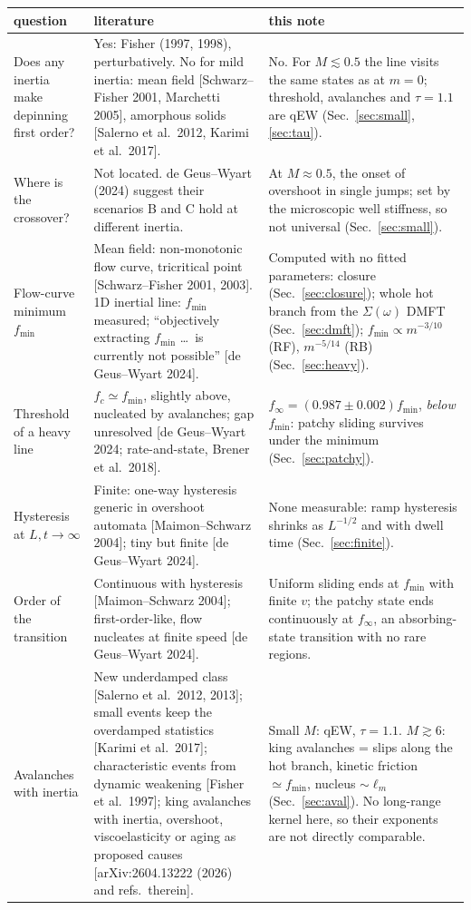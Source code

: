 \documentclass[10pt,a4paper]{article}
\begin{document}
\begin{center}\small
\begin{tabular}{p{2.6cm}p{6.4cm}p{6.6cm}}
\toprule
question & literature & this note \\
\midrule
Does any inertia make depinning first order? & Yes: Fisher (1997, 1998), perturbatively. No for mild inertia: mean field [Schwarz--Fisher 2001, Marchetti 2005], amorphous solids [Salerno et al.\ 2012, Karimi et al.\ 2017]. & No. For $M\lesssim0.5$ the line visits the same states as at $m=0$; threshold, avalanches and $\tau=1.1$ are qEW (Sec.~\ref{sec:small}, \ref{sec:tau}). \\
Where is the crossover? & Not located. de Geus--Wyart (2024) suggest their scenarios B and C hold at different inertia. & At $M\approx0.5$, the onset of overshoot in single jumps; set by the microscopic well stiffness, so not universal (Sec.~\ref{sec:small}). \\
Flow-curve minimum $f_{\min}$ & Mean field: non-monotonic flow curve, tricritical point [Schwarz--Fisher 2001, 2003]. 1D inertial line: $f_{\min}$ measured; ``objectively extracting $f_{\min}$ \ldots\ is currently not possible'' [de Geus--Wyart 2024]. & Computed with no fitted parameters: closure (Sec.~\ref{sec:closure}); whole hot branch from the $\Sigma(\omega)$ DMFT (Sec.~\ref{sec:dmft}); $f_{\min}\propto m^{-3/10}$ (RF), $m^{-5/14}$ (RB) (Sec.~\ref{sec:heavy}). \\
Threshold of a heavy line & $f_c\simeq f_{\min}$, slightly above, nucleated by avalanches; gap unresolved [de Geus--Wyart 2024; rate-and-state, Brener et al.\ 2018]. & $f_\infty=(0.987\pm0.002)f_{\min}$, \emph{below} $f_{\min}$: patchy sliding survives under the minimum (Sec.~\ref{sec:patchy}). \\
Hysteresis at $L,t\to\infty$ & Finite: one-way hysteresis generic in overshoot automata [Maimon--Schwarz 2004]; tiny but finite [de Geus--Wyart 2024]. & None measurable: ramp hysteresis shrinks as $L^{-1/2}$ and with dwell time (Sec.~\ref{sec:finite}). \\
Order of the transition & Continuous with hysteresis [Maimon--Schwarz 2004]; first-order-like, flow nucleates at finite speed [de Geus--Wyart 2024]. & Uniform sliding ends at $f_{\min}$ with finite $v$; the patchy state ends continuously at $f_\infty$, an absorbing-state transition with no rare regions. \\
Avalanches with inertia & New underdamped class [Salerno et al.\ 2012, 2013]; small events keep the overdamped statistics [Karimi et al.\ 2017]; characteristic events from dynamic weakening [Fisher et al.\ 1997]; king avalanches with inertia, overshoot, viscoelasticity or aging as proposed causes [arXiv:2604.13222 (2026) and refs.\ therein]. & Small $M$: qEW, $\tau=1.1$. $M\gtrsim6$: king avalanches = slips along the hot branch, kinetic friction $\simeq f_{\min}$, nucleus $\sim\ell_m$ (Sec.~\ref{sec:aval}). No long-range kernel here, so their exponents are not directly comparable. \\

\end{tabular}
\end{center}
\end{document}
